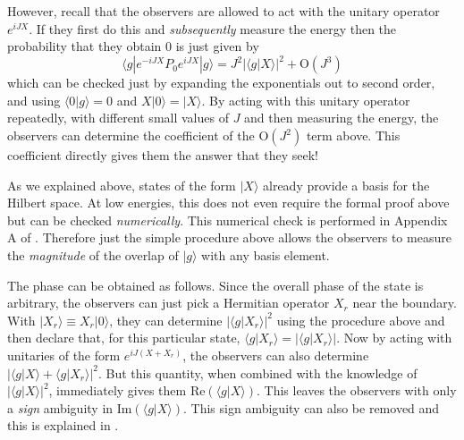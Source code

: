 \documentclass[12pt]{article}
\def\Or[#1]{{\text{O}}\left({#1}\right)}
\newcommand{\be}{\begin{equation}}
\newcommand{\ee}{\end{equation}}
\def\projvac{{\cal P}_{\Omega}}
\def\projvac{P_0}
\begin{document}
However, recall that the observers are allowed to act with the unitary operator $e^{i J X}$. If they first do this and  {\em subsequently} measure the energy then the probability that they obtain $0$ is just given by
\be
\langle g | e^{-i J X} \projvac e^{i J X} | g \rangle =  J^2 |\langle g | X \rangle|^2 + \Or[J^3]
\ee
which can be checked just by expanding the exponentials out to second order, and using $\langle 0 | g \rangle = 0$ and $X|0 \rangle = |X \rangle$. By acting with this unitary operator repeatedly, with different small values of $J$ and then measuring the energy, the observers can determine the coefficient of the $\Or[J^2]$ term above. This coefficient directly gives them the answer that they seek!






As we explained above, states of the form $| X \rangle$ already provide a basis for the Hilbert space. At low energies, this does not even require the formal proof above but can be checked {\em numerically}. This numerical check is performed in Appendix A of \cite{Chowdhury:2020hse}. Therefore just the simple procedure above allows the observers to measure the {\em magnitude} of the overlap of $|g \rangle$ with any basis element.

The phase can be obtained as follows.  Since the overall phase of the state is arbitrary, the observers can just pick a Hermitian operator $X_r$ near the boundary.  With $|X_r \rangle \equiv X_r | 0 \rangle$, they can determine $|\langle g| X_r \rangle|^2$ using the procedure above and then declare that, for this particular state,  $\langle g | X_r \rangle = |\langle g | X_r \rangle|$. Now by acting with unitaries of the form $e^{i J(X + X_r)}$, the observers can also determine $|\langle g| X \rangle + \langle g | X_r \rangle|^2$. But this quantity, when combined with the knowledge of $|\langle g| X \rangle|^2$, immediately gives them  $\text{Re} \left(\langle g | X \rangle\right)$. This leaves the observers with only a {\em sign} ambiguity in $\text{Im}(\langle g | X \rangle)$. This sign ambiguity can also be removed and this is  explained in \cite{Chowdhury:2020hse}.
\end{document}
